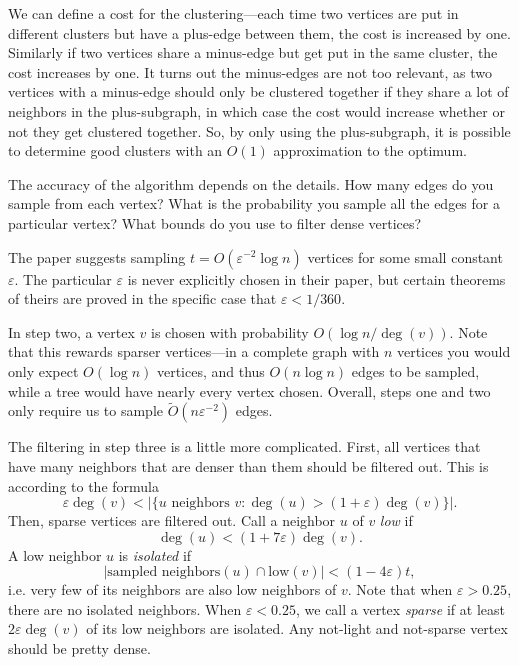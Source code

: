 \documentclass[
]{article}
\begin{document}
We can define a cost for the clustering---each time two vertices are
put in different clusters but have a plus-edge between them, the cost is
increased by one. Similarly if two vertices share a minus-edge but get
put in the same cluster, the cost increases by one. It turns out the
minus-edges are not too relevant, as two vertices with a minus-edge
should only be clustered together if they share a lot of neighbors in
the plus-subgraph, in which case the cost would increase whether or not
they get clustered together. So, by only using the plus-subgraph, it is
possible to determine good clusters with an {\(O(1)\)} approximation to
the optimum.

The accuracy of the algorithm depends on the details. How many edges do
you sample from each vertex? What is the probability you sample all the
edges for a particular vertex? What bounds do you use to filter dense
vertices?

The paper suggests sampling {\(t = O(\varepsilon^{- 2}\log n)\)}
vertices for some small constant {\(\varepsilon\)}. The particular
  {\(\varepsilon\)} is
never explicitly chosen in their paper, but certain theorems of theirs
are proved in the specific case that {\(\varepsilon < 1/360\)}.

In step two, a vertex {\(v\)} is chosen with probability
  {\(O(\log n/\deg(v))\)}. Note that this rewards sparser vertices---in a
complete graph with {\(n\)} vertices you would only expect
  {\(O(\log n)\)} vertices, and thus {\(O(n\log n)\)} edges to be sampled,
while a tree would have nearly every vertex chosen. Overall, steps one
and two only require us to sample
  {\(\tilde{O}(n\varepsilon^{- 2})\)} edges.

The filtering in step three is a little more complicated. First, all
vertices that have many neighbors that are denser than them should be filtered out. This is
according to the formula
  {\[\varepsilon\deg(v) < |\{ u\text{~neighbors~}v:\deg(u) > (1 + \varepsilon)\deg(v)\}|.\]}Then, sparse vertices are filtered out.
Call a neighbor $u$ of $v$ \emph{low} if
  {\[\deg(u) < (1 + 7\varepsilon)\deg(v).\]}A low neighbor {\(u\)} is
\emph{isolated} if
{\[|\text{sampled\ neighbors}(u) \cap \text{low}(v)| < (1 - 4\varepsilon)t,\]}i.e.
very few of its neighbors are also low neighbors of {\(v\)}. Note that when $\varepsilon > 0.25$, there are no isolated neighbors. When $\varepsilon < 0.25$, we call a vertex \emph{sparse} if at least {\(2\varepsilon\deg(v)\)} of its low neighbors are isolated. Any not-light and not-sparse vertex should be pretty dense.
\end{document}
